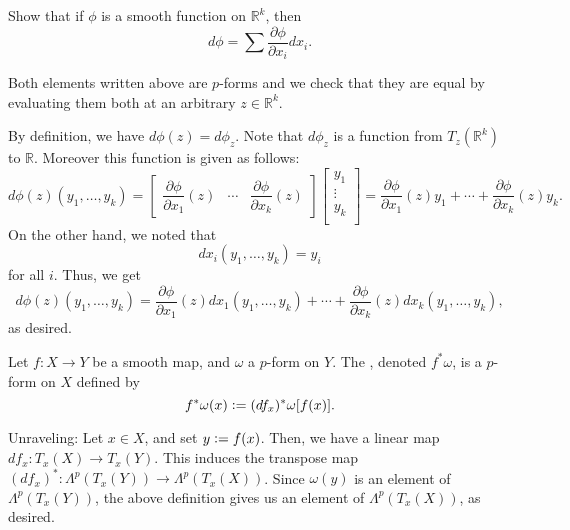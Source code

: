 \documentclass[12pt]{article}
\begin{document}
\begin{exe} \label{exe:d-phi-summation-partials}
	Show that if $\phi$ is a smooth function on $\mathbb{R}^{k}$, then
	\begin{equation*} 
		d \phi = \sum \frac{\partial \phi}{\partial x_{i}} dx_{i}.
	\end{equation*}
\end{exe}
\begin{soln}
	Both elements written above are $p$-forms and we check that they are equal by evaluating them both at an arbitrary $z \in \mathbb{R}^{k}$.

	By definition, we have $d \phi(z) = d\phi_{z}$. Note that $d\phi_{z}$ is a function from $T_{z}(\mathbb{R}^{k})$ to $\mathbb{R}$. Moreover this function is given as follows:
	\begin{equation*} 
		d \phi(z)(y_{1}, \ldots, y_{k}) = 
		\begin{bmatrix}
			\dfrac{\partial \phi}{\partial x_{1}}(z) & \cdots & \dfrac{\partial \phi}{\partial x_{k}}(z)
		\end{bmatrix}
		\begin{bmatrix}
			y_{1} \\
			\vdots \\
			y_{k} \\
		\end{bmatrix}
		= \frac{\partial \phi}{\partial x_{1}}(z) y_{1} + \cdots + \frac{\partial \phi}{\partial x_{k}}(z) y_{k}.
	\end{equation*}
	On the other hand, we noted that
	\begin{equation*} 
		dx_{i}(y_{1}, \ldots, y_{k}) = y_{i}
	\end{equation*}
	for all $i$. Thus, we get
	\begin{equation*} 
		d \phi(z)(y_{1}, \ldots, y_{k}) = \frac{\partial \phi}{\partial x_{1}}(z) dx_{1}(y_{1}, \ldots, y_{k}) + \cdots + \frac{\partial \phi}{\partial x_{k}}(z) dx_{k}(y_{1}, \ldots, y_{k}),
	\end{equation*}
	as desired.
\end{soln}

\begin{defn}
	Let $f : X \to Y$ be a smooth map, and $\omega$ a $p$-form on $Y$. The , denoted $f^{\ast} \omega$, is a $p$-form on $X$ defined by
	\begin{equation*} 
		f^{\ast} \omega(x) \vcentcolon= (df_{x})^{\ast} \omega[f(x)].
	\end{equation*}
\end{defn}
Unraveling: Let $x \in X$, and set $y \vcentcolon= f(x)$. Then, we have a linear map $df_{x} : T_{x}(X) \to T_{x}(Y)$. This induces the transpose map $(df_{x})^{\ast} : \Lambda^{p}(T_{x}(Y)) \to \Lambda^{p}(T_{x}(X))$. Since $\omega(y)$ is an element of $\Lambda^{p}(T_{x}(Y))$, the above definition gives us an element of $\Lambda^{p}(T_{x}(X))$, as desired.
\end{document}
